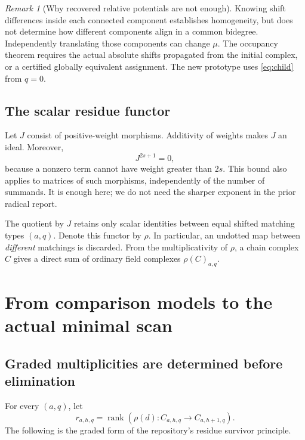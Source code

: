 \documentclass[11pt,letterpaper]{article}
\theoremstyle{remark}\newtheorem{remark}[theorem]{Remark}
\newcommand{\rk}{\operatorname{rank}}
\begin{document}
\begin{remark}[Why recovered relative potentials are not enough]
Knowing shift differences inside each connected component establishes homogeneity, but does not determine how different components align in a common bidegree. Independently translating those components can change $\mu$. The occupancy theorem requires the actual absolute shifts propagated from the initial complex, or a certified globally equivalent assignment. The new prototype uses \eqref{eq:child} from $q=0$.
\end{remark}

\subsection{The scalar residue functor}
Let $J$ consist of positive-weight morphisms. Additivity of weights makes $J$ an ideal. Moreover,
\begin{equation}\label{eq:nilpotent}
 J^{2s+1}=0,
\end{equation}
because a nonzero term cannot have weight greater than $2s$. This bound also applies to matrices of such morphisms, independently of the number of summands. It is enough here; we do not need the sharper exponent in the prior radical report.

The quotient by $J$ retains only scalar identities between equal shifted matching types $(a,q)$. Denote this functor by $\rho$. In particular, an undotted map between \emph{different} matchings is discarded. From the multiplicativity of $\rho$, a chain complex $C$ gives a direct sum of ordinary field complexes $\rho(C)_{a,q}$.

\section{From comparison models to the actual minimal scan}
\subsection{Graded multiplicities are determined before elimination}
For every $(a,q)$, let
\[
 r_{a,h,q}=\rk\left(\rho(d):C_{a,h,q}\longrightarrow C_{a,h+1,q}\right).
\]
The following is the graded form of the repository's residue survivor principle.
\end{document}
